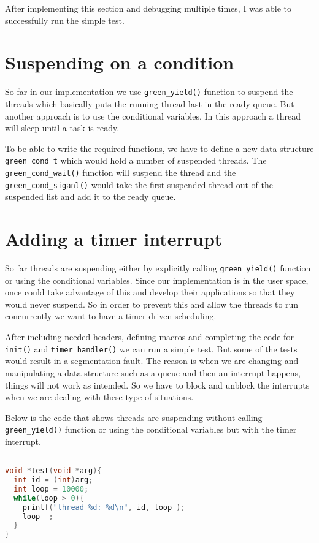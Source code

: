\documentclass[a4paper,10pt]{article}
\begin{document}
After implementing this section and debugging multiple times, I was able to successfully run the simple test.

\section*{Suspending on a condition}
So far in our implementation we use \texttt{green\_yield()} function to suspend the threads which basically puts the running thread last in the ready queue. But another approach is to use the conditional variables. In this approach a thread will sleep until a task is ready.

To be able to write the required functions, we have to define a new data structure \texttt{green\_cond\_t} which would hold a number of suspended threads. The \texttt{green\_cond\_wait()} function will suspend the thread and the \texttt{green\_cond\_siganl()} would take the first suspended thread out of the suspended list and add it to the ready queue.

\section*{Adding a timer interrupt}
So far threads are suspending either by explicitly calling \texttt{green\_yield()} function or using the conditional variables. Since our implementation is in the user space, once could take advantage of this and develop their applications so that they would never suspend. So in order to prevent this and allow the threads to run concurrently we want to have a timer driven scheduling.

After including needed headers, defining macros and completing the code for \texttt{init()} and \texttt{timer\_handler()} we can run a simple test. But some of the tests would result in a segmentation fault. The reason is when we are changing and manipulating a data structure such as a queue and then an interrupt happens, things will not work as intended. So we have to block and unblock the interrupts when we are dealing with these type of situations.

Below is the code that shows threads are suspending without calling \texttt{green\_yield()} function or using the conditional variables but with the timer interrupt.

\begin{lstlisting}[language=C]

void *test(void *arg){
  int id = (int)arg;
  int loop = 10000;
  while(loop > 0){
    printf("thread %d: %d\n", id, loop );
    loop--;
  }
}

\end{lstlisting}
\end{document}
